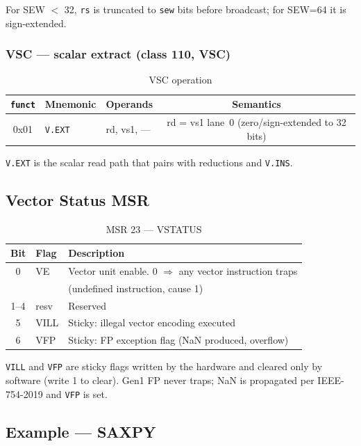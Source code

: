 \documentclass[11pt,a4paper]{article}
\begin{document}
For SEW $<$ 32, {\tt rs} is truncated to {\tt sew} bits before broadcast;
for SEW=64 it is sign-extended.

\subsubsection*{VSC --- scalar extract (class 110, VSC)}

\begin{table}[H]
\centering
\caption{VSC operation}
\begin{tabular}{cllc}
\toprule
{\tt funct} & Mnemonic & Operands & Semantics \\
\midrule
0x01 & {\tt V.EXT} & rd, vs1, --- & rd = vs1 lane~0 (zero/sign-extended to 32 bits) \\
\bottomrule
\end{tabular}
\end{table}

{\tt V.EXT} is the scalar read path that pairs with reductions and {\tt V.INS}.

\subsection{Vector Status MSR}

\begin{table}[H]
\centering
\caption{MSR 23 --- VSTATUS}
\begin{tabular}{cll}
\toprule
Bit & Flag & Description \\
\midrule
0   & VE    & Vector unit enable. 0 $\Rightarrow$ any vector instruction traps \\
    &       & (undefined instruction, cause 1) \\
1--4 & resv & Reserved \\
5   & VILL  & Sticky: illegal vector encoding executed \\
6   & VFP   & Sticky: FP exception flag (NaN produced, overflow) \\
\bottomrule
\end{tabular}
\end{table}

{\tt VILL} and {\tt VFP} are sticky flags written by the hardware and cleared
only by software (write 1 to clear). Gen1 FP never traps; NaN is propagated
per IEEE-754-2019 and {\tt VFP} is set.

\subsection{Example --- SAXPY}
\end{document}
